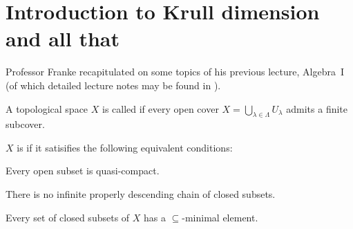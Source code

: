 \documentclass[a4paper,parskip=half,numbers=enddot, DIV=12]{scrreprt}
\begin{document}
\section{Introduction to Krull dimension and all that}
Professor Franke recapitulated on some topics of his previous lecture, Algebra~I (of which detailed lecture notes may be found in \cite{alg1}).
\begin{defi}
	A topological space $X$ is called  if every open cover $X = \bigcup_{\lambda\in\Lambda} U_\lambda$ admits a finite subcover.
	
	$X$ is  if it satisifies the following equivalent conditions:
	\begin{alphanumerate}
		\item Every open subset is quasi-compact.
		\item There is no infinite properly descending chain of closed subsets.
		\item Every set of closed subsets of $X$ has a $\subseteq$-minimal element.
	\end{alphanumerate}
\end{defi}
\end{document}
